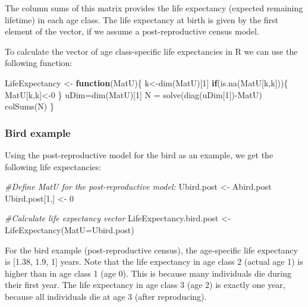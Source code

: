 \documentclass[
]{book}
\newenvironment{Shaded}{\begin{snugshade}}{\end{snugshade}}
\newcommand{\AttributeTok}[1]{\textcolor[rgb]{0.77,0.63,0.00}{#1}}
\newcommand{\CommentTok}[1]{\textcolor[rgb]{0.56,0.35,0.01}{\textit{#1}}}
\newcommand{\ControlFlowTok}[1]{\textcolor[rgb]{0.13,0.29,0.53}{\textbf{#1}}}
\newcommand{\DecValTok}[1]{\textcolor[rgb]{0.00,0.00,0.81}{#1}}
\newcommand{\FunctionTok}[1]{\textcolor[rgb]{0.00,0.00,0.00}{#1}}
\newcommand{\NormalTok}[1]{#1}
\newcommand{\OtherTok}[1]{\textcolor[rgb]{0.56,0.35,0.01}{#1}}
\newcommand{\SpecialCharTok}[1]{\textcolor[rgb]{0.00,0.00,0.00}{#1}}
\begin{document}
The column sums of this matrix provides the life expectancy (expected remaining lifetime) in each age class. The life expectancy at birth is given by the first element of the vector, if we assume a post-reproductive census model.

To calculate the vector of age class-specific life expectancies in R we can use the following function:

\begin{Shaded}
\begin{Highlighting}[]
\NormalTok{ LifeExpectancy }\OtherTok{\textless{}{-}} \ControlFlowTok{function}\NormalTok{(MatU)\{   }
\NormalTok{  k}\OtherTok{\textless{}{-}}\FunctionTok{dim}\NormalTok{(MatU)[}\DecValTok{1}\NormalTok{]}
  \ControlFlowTok{if}\NormalTok{(}\FunctionTok{is.na}\NormalTok{(MatU[k,k]))\{}
\NormalTok{    MatU[k,k]}\OtherTok{\textless{}{-}}\DecValTok{0}
\NormalTok{  \}}
\NormalTok{  uDim}\OtherTok{=}\FunctionTok{dim}\NormalTok{(MatU)[}\DecValTok{1}\NormalTok{]}
\NormalTok{  N }\OtherTok{=} \FunctionTok{solve}\NormalTok{(}\FunctionTok{diag}\NormalTok{(uDim[}\DecValTok{1}\NormalTok{])}\SpecialCharTok{{-}}\NormalTok{MatU)   }
  \FunctionTok{colSums}\NormalTok{(N)  }
\NormalTok{\}}
\end{Highlighting}
\end{Shaded}

\hypertarget{bird-example-8}{%
\subsubsection*{Bird example}\label{bird-example-8}}

Using the post-reproductive model for the bird as an example, we get the following life expectancies:

\begin{Shaded}
\begin{Highlighting}[]
\CommentTok{\#Define MatU for the post{-}reproductive model:}
\NormalTok{Ubird.post }\OtherTok{\textless{}{-}}\NormalTok{ Abird.post}
\NormalTok{Ubird.post[}\DecValTok{1}\NormalTok{,] }\OtherTok{\textless{}{-}} \DecValTok{0} 

\CommentTok{\#Calculate life expectancy vector}
\NormalTok{ LifeExpectancy.bird.post }\OtherTok{\textless{}{-}} \FunctionTok{LifeExpectancy}\NormalTok{(}\AttributeTok{MatU=}\NormalTok{Ubird.post)}
\end{Highlighting}
\end{Shaded}

For the bird example (post-reproductive census), the age-specific life expectancy is {[}1.38, 1.9, 1{]} years. Note that the life expectancy in age class 2 (actual age 1) is higher than in age class 1 (age 0). This is because many individuals die during their first year. The life expectancy in age class 3 (age 2) is exactly one year, because all individuals die at age 3 (after reproducing).
\end{document}
